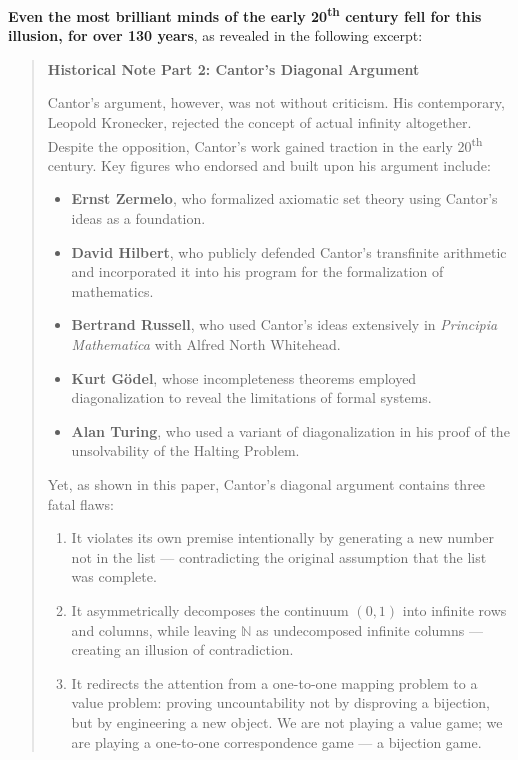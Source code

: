 \documentclass[12pt]{article}
\theoremstyle{definition} %
\numberwithin{equation}{section}
\begin{document}
\vspace{1em}
\textbf{Even the most brilliant minds of the early 20\textsuperscript{th} century fell for this illusion, for over 130 years}, as revealed in the following excerpt:

\begin{quote}
\textbf{Historical Note Part 2: Cantor’s Diagonal Argument}

Cantor's argument, however, was not without criticism. His contemporary, Leopold Kronecker, rejected the concept of actual infinity altogether. 
Despite the opposition, Cantor's work gained traction in the early 20\textsuperscript{th} century. Key figures who endorsed and built upon 
his argument include:

\begin{itemize}
  \item \textbf{Ernst Zermelo}, who formalized axiomatic set theory using Cantor's ideas as a foundation.
  \item \textbf{David Hilbert}, who publicly defended Cantor’s transfinite arithmetic and incorporated it into his program for the formalization of mathematics.
  \item \textbf{Bertrand Russell}, who used Cantor’s ideas extensively in \textit{Principia Mathematica} with Alfred North Whitehead.
  \item \textbf{Kurt Gödel}, whose incompleteness theorems employed diagonalization to reveal the limitations of formal systems.
  \item \textbf{Alan Turing}, who used a variant of diagonalization in his proof of the unsolvability of the Halting Problem.
\end{itemize}

Yet, as shown in this paper, Cantor’s diagonal argument contains three fatal flaws:

\begin{enumerate}
\item It violates its own premise intentionally by generating a new number not in the list — contradicting the original assumption that the list was complete.

\item It asymmetrically decomposes the continuum \( (0,1) \) into infinite rows and columns, while leaving \( \mathbb{N} \) as undecomposed infinite columns — creating an illusion of contradiction.

  \item It redirects the attention from a one-to-one mapping problem to a value problem: proving uncountability not by disproving a bijection, but by engineering a new object. We are not playing a value game; we are playing a one-to-one correspondence game — a bijection game.
\end{enumerate}

\end{quote}
\end{document}

